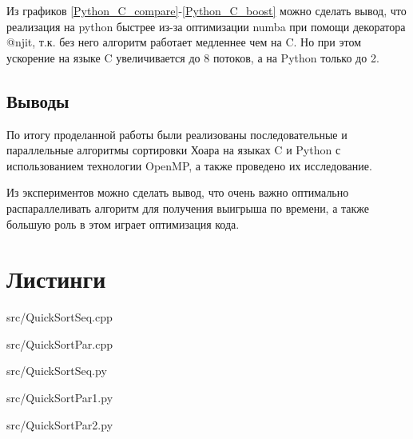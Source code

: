 \documentclass[a4paper,oneside,14pt]{extreport}
\begin{document}
\newpage
Из графиков \ref{Python_C_compare}-\ref{Python_C_boost} можно сделать вывод, что реализация на python быстрее из-за оптимизации numba при помощи декоратора @njit, т.к. без него алгоритм работает медленнее чем на C. Но при этом ускорение на языке C увеличивается до 8 потоков, а на Python только до 2.

\section*{Выводы}
По итогу проделанной работы были реализованы последовательные и параллельные алгоритмы сортировки Хоара на языках C и Python с использованием технологии OpenMP, а также проведено их исследование.

Из экспериментов можно сделать вывод, что очень важно оптимально распараллеливать алгоритм для получения выигрыша по времени, а также большую роль в этом играет оптимизация кода. 

\chapter*{Листинги}

\begin{lstinputlisting}[
	caption={Последовательный алгоритм сортировки Хоара на языке C},
	label={QuickSortSeq.cpp},
	style={c},
	]{src/QuickSortSeq.cpp}
\end{lstinputlisting}

\begin{lstinputlisting}[
caption={Параллельные алгоритмы сортировки Хоара на языке C},
label={QuickSortPar.cpp},
style={c},
]{src/QuickSortPar.cpp}
\end{lstinputlisting}

\newpage
\begin{lstinputlisting}[
	caption={Последовательные алгоритм сортировки Хоара на языке Python},
	label={QuickSortSeq.py},
	style={c},
	language={Python}
	]{src/QuickSortSeq.py}
\end{lstinputlisting}

\newpage
\begin{lstinputlisting}[
caption={Параллельный алгоритм сортировки Хоара на языке Python с использованием numba},
label={QuickSortPar1.py},
style={c},
language={Python}
]{src/QuickSortPar1.py}
\end{lstinputlisting}

\newpage
\begin{lstinputlisting}[
caption={Параллельный алгоритм сортировки Хоара на языке Python с использованием numba.openmp},
label={QuickSortPar2.py},
style={c},
language={Python}
]{src/QuickSortPar2.py}
\end{lstinputlisting}
\end{document}
